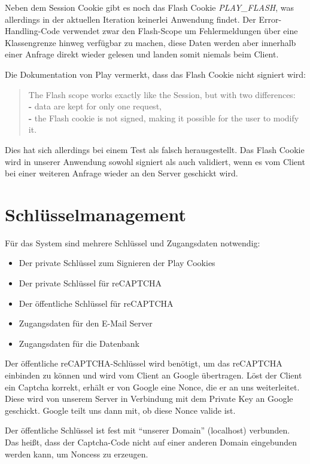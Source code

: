 \documentclass[12pt,DIV14,BCOR10mm,a4paper,parskip=half-,headsepline,headinclude,english,ngerman,bibliography=totocnumbered]{scrreprt}
\begin{document}
Neben dem Session Cookie gibt es noch das Flash Cookie \textit{PLAY\_FLASH}, was allerdings in der aktuellen Iteration keinerlei Anwendung findet. Der Error-Handling-Code verwendet zwar den Flash-Scope um Fehlermeldungen über eine Klassengrenze hinweg verfügbar zu machen, diese Daten werden aber innerhalb einer Anfrage direkt wieder gelesen und landen somit niemals beim Client.

Die Dokumentation von Play vermerkt, dass das Flash Cookie nicht signiert wird:
\blockquote{
The Flash scope works exactly like the Session, but with two differences: \\
\textbf{-} data are kept for only one request, \\
\textbf{-} the Flash cookie is not signed, making it possible for the user to modify it. \autocite{JavaPlayFlashDocu}
}
Dies hat sich allerdings bei einem Test als falsch herausgestellt. Das Flash Cookie wird in unserer Anwendung sowohl signiert als auch validiert, wenn es vom Client bei einer weiteren Anfrage wieder an den Server geschickt wird.

\section{Schlüsselmanagement}
Für das System sind mehrere Schlüssel und Zugangsdaten notwendig:

\begin{itemize}
	\item Der private Schlüssel zum Signieren der Play Cookies
	\item Der private Schlüssel für reCAPTCHA
	\item Der öffentliche Schlüssel für reCAPTCHA
	\item Zugangsdaten für den E-Mail Server
	\item Zugangsdaten für die Datenbank
\end{itemize}

Der öffentliche reCAPTCHA-Schlüssel wird benötigt, um das reCAPTCHA einbinden zu können und wird vom Client an Google übertragen. Löst der Client ein Captcha korrekt, erhält er von Google eine Nonce, die er an uns weiterleitet. Diese wird von unserem Server in Verbindung mit dem Private Key an Google geschickt. Google teilt uns dann mit, ob diese Nonce valide ist.

Der öffentliche Schlüssel ist fest mit \enquote{unserer Domain} (localhost) verbunden. Das heißt, dass der Captcha-Code nicht auf einer anderen Domain eingebunden werden kann, um Noncess zu erzeugen.
\end{document}
